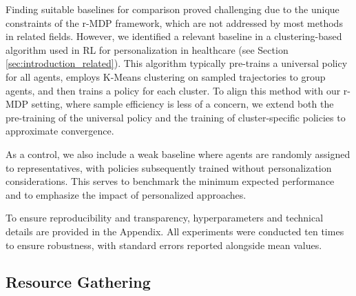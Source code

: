 \documentclass[letterpaper]{article} %
\begin{document}
Finding suitable baselines for comparison proved challenging due to the unique constraints of the r-MDP framework, which are not addressed by most methods in related fields. However, we identified a relevant baseline in a clustering-based algorithm used in RL for personalization in healthcare (see Section \ref{sec:introduction_related}). This algorithm typically pre-trains a universal policy for all agents, employs K-Means clustering on sampled trajectories to group agents, and then trains a policy for each cluster. To align this method with our r-MDP setting, where sample efficiency is less of a concern, we extend both the pre-training of the universal policy and the training of cluster-specific policies to approximate convergence.

As a control, we also include a weak baseline where agents are randomly assigned to representatives, with policies subsequently trained without personalization considerations. This serves to benchmark the minimum expected performance and to emphasize the impact of personalized approaches.

To ensure reproducibility and transparency, hyperparameters and technical details are provided in the Appendix. All experiments were conducted ten times to ensure robustness, with standard errors reported alongside mean values.


\subsection{Resource Gathering}
\label{sec:experiments_resource}
\end{document}
